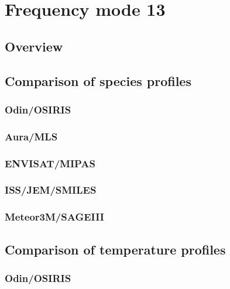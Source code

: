 \section{Frequency mode 13}
\label{sec:fm13}

\subsection{Overview}
\label{sec:fm13:overview}

\subsection{Comparison of species profiles}
\label{sec:fm13:comparison:species}

\subsubsection{Odin/OSIRIS}
\label{sec:fm13:comparison:species:osiris}

\subsubsection{Aura/MLS}
\label{sec:fm13:comparison:species:mls}

\subsubsection{ENVISAT/MIPAS}
\label{sec:fm13:comparison:species:mipas}

\subsubsection{ISS/JEM/SMILES}
\label{sec:fm13:comparison:species:smiles}

\subsubsection{Meteor3M/SAGEIII}
\label{sec:fm13:comparison:species:sage3}


\subsection{Comparison of temperature profiles}
\label{sec:fm13:comparison:temperature}

\subsubsection{Odin/OSIRIS}
\label{sec:fm13:comparison:temperature:osiris}

